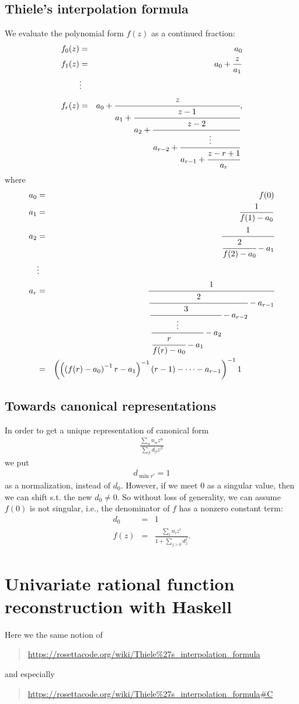 \documentclass[11pt]{book}
\begin{document}
\subsection{Thiele's interpolation formula}
We evaluate the polynomial form $f(z)$ as a continued fraction:
\begin{eqnarray}
f_0(z) &=& a_0 \\
f_1(z) &=& a_0 + \frac{z}{a_1} \\
\nonumber
&\vdots& \\
f_r(z) &=& a_0 + \cfrac{z}{a_1 + \cfrac{z-1}{a_2 + \cfrac{z- 2}{a_{r-2} + \cfrac{\vdots}{a_{r-1} + \cfrac{z-r+1}{a_r}}}}},
\end{eqnarray}
where
\begin{eqnarray}
a_0 &=& f(0) \\
a_1 &=& \frac{1}{f(1) - a_0}\\
a_2 &=& \cfrac{1}{\cfrac{2}{f(2)-a_0} - a_1} \\
\nonumber
&\vdots& \\
a_r &=&\cfrac{1}{\cfrac{2}{\cfrac{3}{\cfrac{\vdots}{\cfrac{r}{f(r)-a_0}-a_1}-a_2} - a_{r-2}} - a_{r-1}} \\
&=& \left( \left( \left( f(r)-a_0 \right)^{-1} r - a_1 \right)^{-1} (r - 1) - \cdots - a_{r-1} \right)^{-1} 1 \qquad\qquad
\end{eqnarray}

\subsection{Towards canonical representations}
In order to get a unique representation of canonical form
\begin{eqnarray}
\frac{\sum_\alpha n_\alpha z^\alpha}{\sum_\beta d_\beta z^\beta}
\end{eqnarray}
we put
\begin{eqnarray}
d_{\min r'} = 1
\end{eqnarray}
as a normalization, instead of $d_0$.
However, if we meet 0 as a singular value, then we can shift s.t. the new $d_0 \neq 0$.
So without loss of generality, we can assume $f(0)$ is not singular, i.e., the denominator of $f$ has a nonzero constant term:
\begin{eqnarray}
d_0 &=& 1\\
f(z) &=& \frac{\sum_i n_i z^i}{1 + \sum_{j >0} d_ z^j}.
\end{eqnarray}

\section{Univariate rational function reconstruction with Haskell}
Here we the same notion of
\begin{quotation}
\url{https://rosettacode.org/wiki/Thiele%27s_interpolation_formula}
\end{quotation}
and especially
\begin{quotation}
\url{https://rosettacode.org/wiki/Thiele%27s_interpolation_formula#C}
\end{quotation}
 
\end{document}
